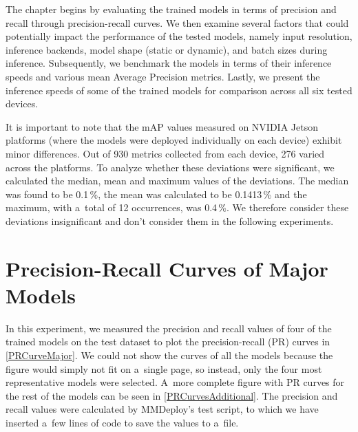 The chapter begins by evaluating the trained models in terms of precision and
recall through precision-recall curves. We then examine several factors that
could potentially impact the performance of the tested models, namely input
resolution, inference backends, model shape (static or dynamic), and batch sizes
during inference. Subsequently, we benchmark the models in terms of their
inference speeds and various mean Average Precision metrics. Lastly, we present
the inference speeds of some of the trained models for comparison across all six
tested devices.

It is important to note that the mAP values measured on NVIDIA Jetson platforms
(where the models were deployed individually on each device) exhibit minor
differences. Out of 930 metrics collected from each device, 276 varied across
the platforms. To analyze whether these deviations were significant, we
calculated the median, mean and maximum values of the deviations. The median was
found to be 0.1\,\%, the mean was calculated to be 0.1413\,\% and the maximum,
with a~total of 12 occurrences, was 0.4\,\%. We therefore consider these
deviations insignificant and don't consider them in the following experiments.


\section{Precision-Recall Curves of Major Models}


In this experiment, we measured the precision and recall values of four of the
trained models on the test dataset to plot the precision-recall (PR) curves in
\autoref{PRCurveMajor}. We could not show the curves of all the models because
the figure would simply not fit on a~single page, so instead, only the four most
representative models were selected. A~more complete figure with PR curves for
the rest of the models can be seen in \autoref{PRCurvesAdditional}. The
precision and recall values were calculated by MMDeploy's test script, to which
we have inserted a~few lines of code to save the values to a~file.

